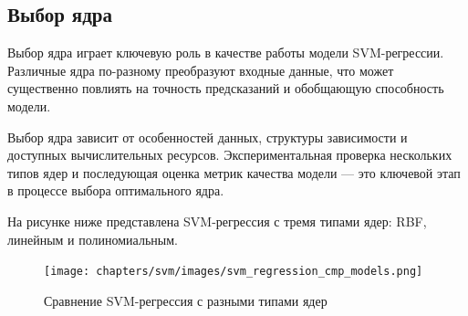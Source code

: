 \subsection{Выбор ядра}
\par Выбор ядра играет ключевую роль в качестве работы модели SVM-регрессии. Различные ядра по-разному преобразуют входные данные, что может существенно повлиять на точность предсказаний и обобщающую способность модели.
\par Выбор ядра зависит от особенностей данных, структуры зависимости и доступных вычислительных ресурсов. Экспериментальная проверка нескольких типов ядер и последующая оценка метрик качества модели — это ключевой этап в процессе выбора оптимального ядра.
\par На рисунке ниже представлена SVM-регрессия с тремя типами ядер: RBF, линейным и полиномиальным. 
\begin{figure}[ht!]
    \texttt{[image: chapters/svm/images/svm\_regression\_cmp\_models.png]}
    \centering
    \caption{Сравнение SVM-регрессия с разными типами ядер}
    \label{fig:kernel_comparison}
\end{figure}

